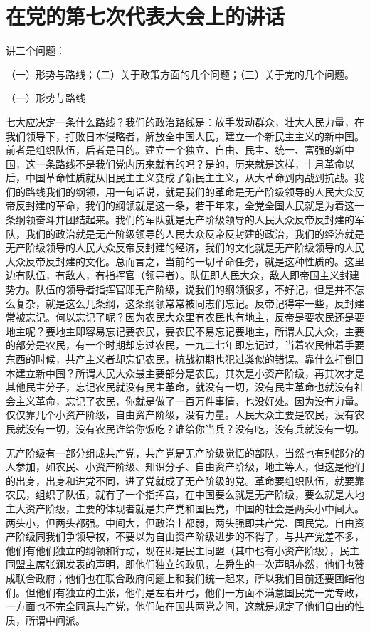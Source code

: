 \section[在党的第七次代表大会上的讲话（一九四五年四月）]{在党的第七次代表大会上的讲话}


讲三个问题：

（一）形势与路线；（二）关于政策方面的几个问题；（三）关于党的几个问题。

（一）形势与路线

七大应决定一条什么路线？我们的政治路线是：放手发动群众，壮大人民力量，在我们领导下，打败日本侵略者，解放全中国人民，建立一个新民主主义的新中国。前者是组织队伍，后者是目的。建立一个独立、自由、民主、统一、富强的新中国，这一条路线不是我们党内历来就有的吗？是的，历来就是这样，十月革命以后，中国革命性质就从旧民主主义变成了新民主主义，从大革命到内战到抗战。我们的路线我们的纲领，用一句话说，就是我们的革命是无产阶级领导的人民大众反帝反封建的革命，我们的纲领就是这一条，若干年来，全党全国人民就是为着这一条纲领奋斗并团结起来。我们的军队就是无产阶级领导的人民大众反帝反封建的军队，我们的政治就是无产阶级领导的人民大众反帝反封建的政治，我们的经济就是无产阶级领导的人民大众反帝反封建的经济，我们的文化就是无产阶级领导的人民大众反帝反封建的文化。总而言之，当前的一切革命任务，就是这种性质的。这里边有队伍，有敌人，有指挥官（领导者）。队伍即人民大众，敌人即帝国主义封建势力。队伍的领导者指挥官即无产阶级，说我们的纲领很多，不好记，但是并不怎么复杂，就是这么几条纲，这条纲领常常被同志们忘记。反帝记得牢一些，反封建常被忘记。何以忘记了呢？因为农民大众里有农民也有地主，反帝是要农民还是要地主呢？要地主即容易忘记要农民，要农民不易忘记要地主，所谓人民大众，主要的部分是农民，有一个时期却忘过农民，一九二七年即忘记过，当着农民伸着手要东西的时候，共产主义者却忘记农民，抗战初期也犯过类似的错误。靠什么打倒日本建立新中国？所谓人民大众最主要部分是农民，其次是小资产阶级，再其次才是其他民主分子，忘记农民就没有民主革命，就没有一切，没有民主革命也就没有社会主义革命，忘记了农民，你就是做了一百万件事情，也没好处。因为没有力量。仅仅靠几个小资产阶级，自由资产阶级，没有力量。人民大众主要是农民，没有农民就没有一切，没有农民谁给你饭吃？谁给你当兵？没有吃，没有兵就没有一切。

无产阶级有一部分组成共产党，共产党是无产阶级觉悟的部队，当然也有别部分的人参加，如农民、小资产阶级、知识分子、自由资产阶级，地主等人，但这是他们的出身，出身和进党不同，进了党就成了无产阶级的党。革命要组织队伍，就要靠农民，组织了队伍，就有了一个指挥宫，在中国要么就是无产阶级，要么就是大地主大资产阶级，主要的体现者就是共产党和国民党，中国的社会是两头小中间大。两头小，但两头都强。中间大，但政治上都弱，两头强即共产党、国民党。自由资产阶级同我们争领导权，不要以为自由资产阶级进步的不得了，与共产党差不多，他们有他们独立的纲领和行动，现在即是民主同盟（其中也有小资产阶级），民主同盟主席张澜发表的声明，即他们独立的政见，左舜生的一次声明亦然，他们也赞成联合政府；他们也在联合政府问题上和我们统一起来，所以我们目前还要团结他们。但他们有独立的主张，他们是左右开弓，他们一方面不满意国民党一党专政，一方面也不完全同意共产党，他们站在国共两党之间，这就是规定了他们自由的性质，所谓中间派。


